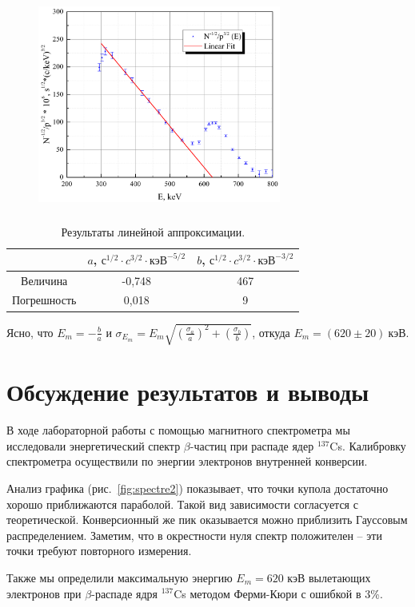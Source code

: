 \documentclass[a4paper,12pt]{article} %
\begin{document}
		\begin{figure}[h!]
			\begin{floatrow}
				{\includegraphics[width=8cm,height=7cm]{graph2.pdf}}   
			\end{floatrow}
		\end{figure}
	
		\begin{table}[H]
			\caption{Результаты линейной аппроксимации.}
			\label{table:Emax}
			\begin{tabular}{|c|c|c|}
				\hline
				& $a$, $\text{с}^{1/2} \cdot {c^{3/2}} \cdot\text{кэВ}^{-5/2}$ & $b$, $\text{с}^{1/2} \cdot {c^{3/2}} \cdot\text{кэВ}^{-3/2}$ \\ \hline
							Величина    & -0,748                                                        & 467                                                                     \\ \hline
							Погрешность & 0,018                                                         & 9                                                                       \\ \hline
						\end{tabular}
		\end{table}
		Ясно, что $E_m = - \frac{b}{a}$ и $\sigma_{E_m} = E_m \sqrt{\left(\frac{\sigma_a}{a}\right)^2 + \left(\frac{\sigma_b}{b}\right)}$, откуда $E_m =(620 \pm 20) \ \text{кэВ}.$
		

\newpage
\section{Обсуждение результатов и выводы}
	В ходе лабораторной работы с помощью магнитного спектрометра мы исследовали энергетический спектр $\beta$-частиц при распаде ядер $^{137}$Cs. Калибровку спектрометра осуществили по энергии электронов внутренней конверсии.
	
	Анализ графика (рис.~\ref{fig:spectre2}) показывает, что точки купола достаточно хорошо приближаются параболой. Такой вид зависимости согласуется с теоретической. Конверсионный же пик оказывается можно приблизить Гауссовым распределением. Заметим, что в окрестности нуля спектр положителен -- эти точки требуют повторного измерения.
	
	Также мы определили максимальную энергию $E_m = 620$ кэВ вылетающих электронов при $\beta$-распаде ядря $^{137}$Cs методом Ферми-Кюри  с ошибкой в 3\%.
\end{document}
